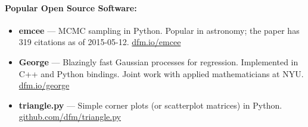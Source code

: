 \documentclass[12pt]{article}
\begin{document}
\paragraph{Popular Open Source Software:}
\begin{itemize}\setlength{\itemsep}{0pt}

\item {\bf emcee} ---
    MCMC sampling in Python. Popular in astronomy; the paper has 319 citations
    as of 2015-05-12. \url{dfm.io/emcee}

\item {\bf George} ---
    Blazingly fast Gaussian processes for regression. Implemented in C++ and
    Python bindings. Joint work with applied mathematicians at NYU.
    \url{dfm.io/george}

\item {\bf triangle.py} ---
    Simple corner plots (or scatterplot matrices) in Python.
    \url{github.com/dfm/triangle.py}

\end{itemize}
\end{document}
